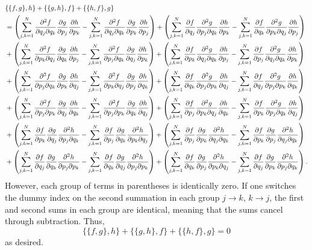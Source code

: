 \documentclass{article}
\begin{document}
\begin{align*}
&\{\{f,g\},h\}+\{\{g,h\},f\}+\{\{h,f\},g\}\\&=
\left(\sum_{j,k=1}^{N}\ppm{f}{q_j}{q_k}\pp{g}{p_j}\pp{h}{p_k}-\sum_{j,k=1}^{N}\ppm{f}{q_j}{q_k}\pp{g}{p_k}\pp{h}{p_j}\right)+\left(\sum_{j,k=1}^{N}\pp{f}{q_j}\ppm{g}{p_j}{q_k}\pp{h}{p_k}-\sum_{j,k=1}^{N}\pp{f}{q_k}\ppm{g}{p_k}{q_j}\pp{h}{p_j}\right)\\&+
\left(\sum_{j,k=1}^{N}\ppm{f}{p_k}{q_j}\pp{g}{q_k}\pp{h}{p_j}-\sum_{j,k=1}^{N}\ppm{f}{p_j}{q_k}\pp{g}{q_j}\pp{h}{p_k}\right)+\left(\sum_{j,k=1}^{N}\pp{f}{p_k}\ppm{g}{q_j}{q_k}\pp{h}{p_j}-\sum_{j,k=1}^{N}\pp{f}{p_j}\ppm{g}{q_j}{q_k}\pp{h}{p_k}\right)\\&+
\left(\sum_{j,k=1}^{N}\ppm{f}{p_j}{q_k}\pp{g}{p_k}\pp{h}{q_j}-\sum_{j,k=1}^{N}\ppm{f}{p_k}{q_j}\pp{g}{p_j}\pp{h}{q_k}\right)+\left(\sum_{j,k=1}^{N}\pp{f}{q_k}\ppm{g}{p_j}{p_k}\pp{h}{q_j}-\sum_{j,k=1}^{N}\pp{f}{q_j}\ppm{g}{p_j}{p_k}\pp{h}{q_k}\right)\\&+
\left(\sum_{j,k=1}^{N}\ppm{f}{p_j}{p_k}\pp{g}{q_j}\pp{h}{q_k}-\sum_{j,k=1}^{N}\ppm{f}{p_j}{p_k}\pp{g}{q_k}\pp{h}{q_j}\right)+\left(\sum_{j,k=1}^{N}\pp{f}{p_j}\ppm{g}{p_k}{q_j}\pp{h}{q_k}-\sum_{j,k=1}^{N}\pp{f}{p_k}\ppm{g}{p_j}{q_k}\pp{h}{q_j}\right)\\&+
\left(\sum_{j,k=1}^{N}\pp{f}{p_k}\pp{g}{q_j}\ppm{h}{p_j}{q_k}-\sum_{j,k=1}^{N}\pp{f}{p_j}\pp{g}{q_k}\ppm{h}{p_k}{q_j}\right)+\left(\sum_{j,k=1}^{N}\pp{f}{p_j}\pp{g}{p_k}\ppm{h}{q_j}{q_k}-\sum_{j,k=1}^{N}\pp{f}{p_k}\pp{g}{p_j}\ppm{h}{q_j}{q_k}\right)\\&+
\left(\sum_{j,k=1}^{N}\pp{f}{q_j}\pp{g}{q_k}\ppm{h}{p_j}{p_k}-\sum_{j,k=1}^{N}\pp{f}{q_k}\pp{g}{q_j}\ppm{h}{p_j}{p_k}\right)+\left(\sum_{j,k=1}^{N}\pp{f}{q_k}\pp{g}{p_j}\ppm{h}{p_k}{q_j}-\sum_{j,k=1}^{N}\pp{f}{q_j}\pp{g}{p_k}\ppm{h}{p_j}{q_k}\right).
\end{align*}
However, each group of terms in parentheses is identically zero. If one switches the dummy index on the second summation in each group $j\to k$, $k\to j$, the first and second sums in each group are identical, meaning that the sums cancel through subtraction. Thus,
$$\{\{f,g\},h\}+\{\{g,h\},f\}+\{\{h,f\},g\}=0
$$ 
as desired.
\end{document}
